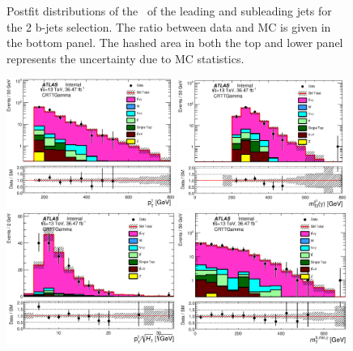 \begin{figure}[htbp]
\begin{center}
\caption{\label{fig:ttVJetPts} Postfit distributions of the \pT\ of the
  leading and subleading jets for the 2 b-jets selection. The ratio between data and MC is given in the bottom panel. The hashed area in both the top and lower panel represents the uncertainty due to MC statistics.}
\end{center}
\end{figure}

\begin{figure}[htbp]
\begin{center}
\includegraphics[width=0.49\textwidth]{figures/ttGamma/postfit/SigPhotonPt_0__CRTTGamma_log.eps}
\includegraphics[width=0.49\textwidth]{figures/ttGamma/postfit/MT2Chi2Photon_CRTTGamma_log.eps}
\includegraphics[width=0.49\textwidth]{figures/ttGamma/postfit/SigPhotonPt_0_sqrtHt_CRTTGamma.eps}
\includegraphics[width=0.49\textwidth]{figures/ttGamma/postfit/MtBMinPhoton_CRTTGamma_log.eps}

\end{center}
\end{figure}
